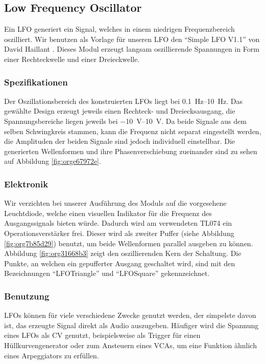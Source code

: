 \newpage
\subsection{Low Frequency Oscillator \label{LFO}}
\label{sec:org8a24bd3}

Ein \ac{LFO} generiert ein Signal, welches in einem niedrigen Frequenzbereich oszilliert. Wir benutzen als Vorlage für unseren \ac{LFO} den "`Simple LFO V1.1"' von David Haillant \cite{haillant:lfo}. Dieses Modul erzeugt langsam oszillierende Spannungen in Form einer Rechteckwelle und einer Dreieckwelle.

\subsubsection{Spezifikationen}
\label{sec:orgf32e18c}
Der Oszillationsbereich des konstruierten \ac{LFO}s liegt bei \SIrange{0.1}{10}{\hertz}. Das gewählte Design erzeugt jeweils einen Rechteck- und Dreiecksausgang, die Spannungsbereiche liegen jeweils bei \SIrange{-10}{10}{\volt}. Da beide Signale aus dem selben Schwingkreis stammen, kann die Frequenz nicht separat eingestellt werden, die Amplituden der beiden Signale sind jedoch individuell einstellbar. Die generierten Wellenformen und ihre Phasenverschiebung zueinander sind zu sehen auf Abbildung \ref{fig:orge67972e}.

\subsubsection{Elektronik}
\label{sec:org879c22a}
Wir verzichten bei unserer Ausführung des Moduls auf die vorgesehene Leuchtdiode, welche einen visuellen Indikator für die Frequenz des Ausgangssignals bieten würde. Dadurch wird am verwendeten TL074 ein Operationsverstärker frei. Dieser wird als zweiter Puffer (siehe Abbildung \ref{fig:org7b85d29}) benutzt, um beide Wellenformen parallel ausgeben zu können. Abbildung \ref{fig:org31668b3} zeigt den oszillierenden Kern der Schaltung. Die Punkte, an welchen ein gepufferter Ausgang geschaltet wird, sind mit den Bezeichnungen "`LFO\textunderscore Triangle"' und "`LFO\textunderscore Square"' gekennzeichnet.

\newpage

\subsubsection{Benutzung}
\label{sec:org5c2d1e2}
\acp{LFO} können für viele verschiedene Zwecke genutzt werden, der simpelste davon ist, das erzeugte Signal direkt als Audio auszugeben. Häufiger wird die Spannung eines \ac{LFO}s als \acl{CV} genutzt, beispielsweise als Trigger für einen Hüllkurvengenerator oder zum Ansteuern eines \acp{VCA}, um eine Funktion ähnlich eines Arpeggiators zu erfüllen.

